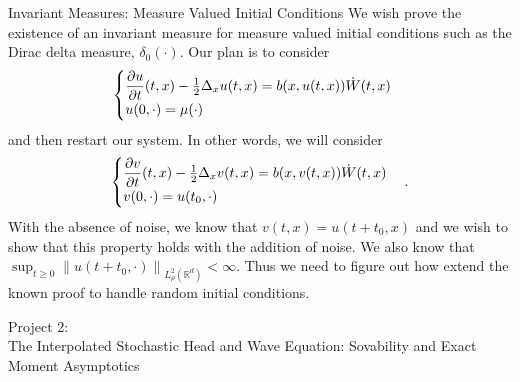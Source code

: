\documentclass{beamer}%
\numberwithin{equation}{section}
\newcommand{\R}{\mathbb{R}}
\newcommand{\Norm}[1]{\left\|  #1   \right\|}
\begin{document}
\begin{frame}{Invariant Measures: Measure Valued Initial Conditions}
We wish prove the existence of an invariant measure for measure valued initial conditions such as the Dirac delta measure, $\delta_0(\cdot)$. Our plan is to consider 
	\[
	\begin{cases}
	\dfrac{\partial u}{\partial t}(t,x)- \frac{1}{2}\Delta_xu(t,x) = b(x, u(t,x))\dot{W}(t,x) &
	\\ u(0,\cdot) = \mu(\cdot)  &
	\end{cases} \vspace{.1in}
	\]
and then restart our system. In other words, we will consider 
			\[
	\begin{cases}
	\dfrac{\partial v}{\partial t}(t,x)- \frac{1}{2}\Delta_xv(t,x) = b(x, v(t,x))\dot{W}(t,x) &
	\\ v(0,\cdot) = u(t_0,\cdot)  &
	\end{cases} \vspace{.1in}.
	\]
With the absence of noise, we know that $v(t,x) = u(t+t_0,x)$ and we wish to show that this property holds with the addition of noise. We also know that $\sup_{t\ge0}\Norm{u(t+t_0,\cdot)}_{L^2_{\rho}(\R^d)} < \infty$. Thus we need to figure out how extend the known proof to handle random initial conditions. 
\end{frame}










	
	
	
	\begin{frame}
		\begin{center}
			Project 2: \\
			The Interpolated Stochastic Head and Wave Equation: Sovability and Exact Moment Asymptotics
		\end{center}
	\end{frame}
	
\end{document}
